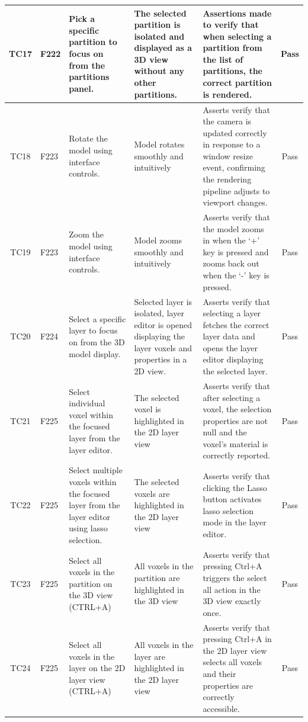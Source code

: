 \documentclass[12pt, titlepage]{article}
\begin{document}
\begin{longtable}{c
    >{\raggedright\arraybackslash}p{1.5cm}
    >{\raggedright\arraybackslash}p{3cm}
    >{\raggedright\arraybackslash}p{3cm}
  >{\raggedright\arraybackslash}p{5cm} c}
  TC17 & F222 & Pick a specific partition to focus on from the partitions panel. & The selected partition is isolated and displayed as a 3D view without any other partitions. & Assertions made to verify that when selecting a partition from the list of partitions, the correct partition is rendered. & \cellcolor{green} Pass \\ \midrule
  TC18 & F223 & Rotate the model using interface controls. & Model rotates smoothly and intuitively & Asserts verify that the camera is updated correctly in response to a window resize event, confirming the rendering pipeline adjusts to viewport changes. & \cellcolor{green} Pass \\ \midrule
  TC19 & F223 & Zoom the model using interface controls. & Model zooms smoothly and intuitively & Asserts verify that the model zooms in when the `+' key is pressed and zooms back out when the `-' key is pressed. & \cellcolor{green} Pass \\ \midrule
  TC20 & F224 & Select a specific layer to focus on from the 3D model display. & Selected layer is isolated, layer editor is opened displaying the layer voxels and properties in a 2D view. & Asserts verify that selecting a layer fetches the correct layer data and opens the layer editor displaying the selected layer. & \cellcolor{green} Pass \\ \midrule
  TC21 & F225 & Select individual voxel within the focused layer from the layer editor. & The selected voxel is highlighted in the 2D layer view & Asserts verify that after selecting a voxel, the selection properties are not null and the voxel's material is correctly reported. & \cellcolor{green} Pass \\ \midrule
  TC22 & F225 & Select multiple voxels within the focused layer from the layer editor using lasso selection. & The selected voxels are highlighted in the 2D layer view & Asserts verify that clicking the Lasso button activates lasso selection mode in the layer editor. & \cellcolor{green} Pass \\ \midrule
  TC23 & F225 & Select all voxels in the partition on the 3D view (CTRL+A) & All voxels in the partition are highlighted in the 3D view & Asserts verify that pressing Ctrl+A triggers the select all action in the 3D view exactly once. & \cellcolor{green} Pass \\ \midrule
  TC24 & F225 & Select all voxels in the layer on the 2D layer view (CTRL+A) & All voxels in the layer are highlighted in the 2D layer view & Asserts verify that pressing Ctrl+A in the 2D layer view selects all voxels and their properties are correctly accessible. & \cellcolor{green} Pass \\
\end{longtable}
\end{document}
